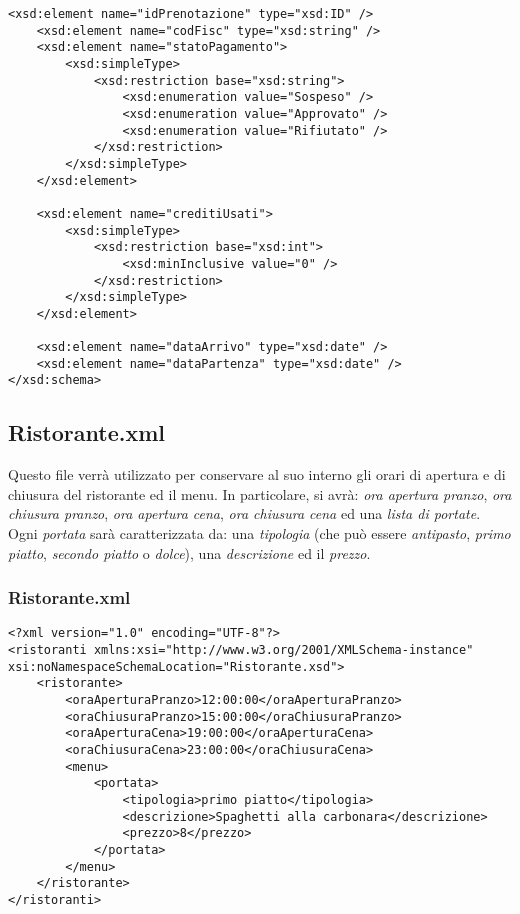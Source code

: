 \documentclass [a4paper, 12pt]{book}
\begin{document}
\begin{lstlisting}[style=XML]
    <xsd:element name="idPrenotazione" type="xsd:ID" />
    <xsd:element name="codFisc" type="xsd:string" />
    <xsd:element name="statoPagamento">
        <xsd:simpleType>
            <xsd:restriction base="xsd:string">
                <xsd:enumeration value="Sospeso" />
                <xsd:enumeration value="Approvato" />
                <xsd:enumeration value="Rifiutato" />
            </xsd:restriction>
        </xsd:simpleType>
    </xsd:element>

    <xsd:element name="creditiUsati">
        <xsd:simpleType>
            <xsd:restriction base="xsd:int">
                <xsd:minInclusive value="0" />
            </xsd:restriction>
        </xsd:simpleType>
    </xsd:element>

    <xsd:element name="dataArrivo" type="xsd:date" />
    <xsd:element name="dataPartenza" type="xsd:date" />
</xsd:schema>
\end{lstlisting}
\subsection{Ristorante.xml}
Questo file verrà utilizzato per conservare al suo interno gli orari di apertura e di chiusura del ristorante ed il menu. In particolare, si avrà: \textit{ora apertura pranzo}, \textit{ora chiusura pranzo}, \textit{ora apertura cena}, \textit{ora chiusura cena} ed una \textit{lista di portate}. Ogni \textit{portata} sarà caratterizzata da:
una \textit{tipologia} (che può essere \textit{antipasto}, \textit{primo piatto}, \textit{secondo piatto} o \textit{dolce}), una \textit{descrizione} ed il \textit{prezzo}.
\subsubsection{Ristorante.xml}
\begin{lstlisting}[style=XML]
<?xml version="1.0" encoding="UTF-8"?>
<ristoranti xmlns:xsi="http://www.w3.org/2001/XMLSchema-instance" xsi:noNamespaceSchemaLocation="Ristorante.xsd">
    <ristorante>
        <oraAperturaPranzo>12:00:00</oraAperturaPranzo>
        <oraChiusuraPranzo>15:00:00</oraChiusuraPranzo>
        <oraAperturaCena>19:00:00</oraAperturaCena>
        <oraChiusuraCena>23:00:00</oraChiusuraCena>
        <menu>
            <portata>
                <tipologia>primo piatto</tipologia>
                <descrizione>Spaghetti alla carbonara</descrizione>
                <prezzo>8</prezzo>
            </portata>
        </menu>
    </ristorante>
</ristoranti>
\end{lstlisting}
\end{document}
